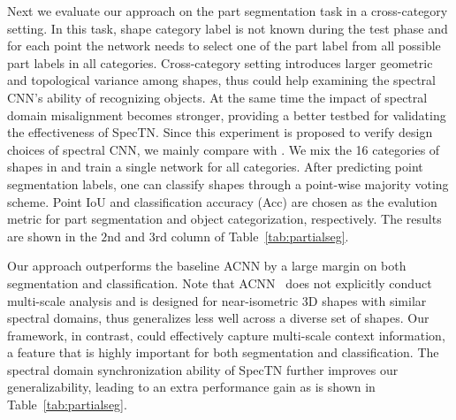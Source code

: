 Next we evaluate our approach on the part segmentation task in a cross-category setting. In this task, shape category label is not known during the test phase and for each point the network needs to select one of the part label from all possible part labels in all categories. Cross-category setting introduces larger geometric and topological variance among shapes, thus could help examining the spectral CNN's ability of recognizing objects. At the same time the impact of spectral domain misalignment becomes stronger, providing a better testbed for validating the effectiveness of SpecTN. %
Since this experiment is proposed to verify design choices of spectral CNN, we mainly compare with \cite{boscaini2016learning}. We mix the 16 categories of shapes in \cite{Yi16} and train a single network for all categories. After predicting point segmentation labels, one can classify shapes through a point-wise majority voting scheme. Point IoU and classification accuracy (Acc) are chosen as the evalution metric for part segmentation and object categorization, respectively. The results are shown in the $2$nd and $3$rd column of Table~\ref{tab:partialseg}.

Our approach outperforms the baseline ACNN by a large margin on both segmentation and classification. Note that ACNN~\cite{boscaini2016learning} does not explicitly conduct multi-scale analysis and is designed for near-isometric 3D shapes with similar spectral domains, thus generalizes less well across a diverse set of shapes. Our framework, in contrast, could effectively capture multi-scale context information, a feature that is highly important for both segmentation and classification. The spectral domain synchronization ability of SpecTN  further improves our generalizability, leading to an extra performance gain as is shown in Table~\ref{tab:partialseg}.

